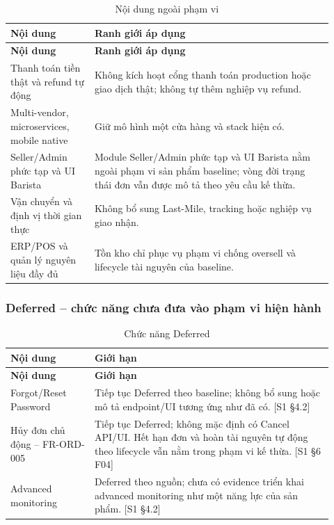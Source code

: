 \begingroup\small
\renewcommand{\arraystretch}{1.2}
\begin{longtable}{>{\raggedright\arraybackslash}p{0.24\linewidth}>{\raggedright\arraybackslash}p{0.68\linewidth}}
\caption{Nội dung ngoài phạm vi}\label{tab:auto-context-and-scope-5}\\
\hline
\textbf{Nội dung} & \textbf{Ranh giới áp dụng} \\ \hline
\endfirsthead
\textbf{Nội dung} & \textbf{Ranh giới áp dụng} \\ \hline
\endhead
Thanh toán tiền thật và refund tự động & Không kích hoạt cổng thanh toán production hoặc giao dịch thật; không tự thêm nghiệp vụ refund. \\ \hline
Multi-vendor, microservices, mobile native & Giữ mô hình một cửa hàng và stack hiện có. \\ \hline
Seller/Admin phức tạp và UI Barista & Module Seller/Admin phức tạp và UI Barista nằm ngoài phạm vi sản phẩm baseline; vòng đời trạng thái đơn vẫn được mô tả theo yêu cầu kế thừa. \\ \hline
Vận chuyển và định vị thời gian thực & Không bổ sung Last-Mile, tracking hoặc nghiệp vụ giao nhận. \\ \hline
ERP/POS và quản lý nguyên liệu đầy đủ & Tồn kho chỉ phục vụ phạm vi chống oversell và lifecycle tài nguyên của baseline. \\ \hline
\end{longtable}
\endgroup

\subsubsection{Deferred -- chức năng chưa đưa vào phạm vi hiện hành}

\begingroup\small
\renewcommand{\arraystretch}{1.2}
\begin{longtable}{>{\raggedright\arraybackslash}p{0.24\linewidth}>{\raggedright\arraybackslash}p{0.68\linewidth}}
\caption{Chức năng Deferred}\label{tab:auto-context-and-scope-6}\\
\hline
\textbf{Nội dung} & \textbf{Giới hạn} \\ \hline
\endfirsthead
\textbf{Nội dung} & \textbf{Giới hạn} \\ \hline
\endhead
Forgot/Reset Password & Tiếp tục Deferred theo baseline; không bổ sung hoặc mô tả endpoint/UI tương ứng như đã có. [S1 §4.2] \\ \hline
Hủy đơn chủ động -- FR-ORD-005 & Tiếp tục Deferred; không mặc định có Cancel API/UI. Hết hạn đơn và hoàn tài nguyên tự động theo lifecycle vẫn nằm trong phạm vi kế thừa. [S1 §6 F04] \\ \hline
Advanced monitoring & Deferred theo nguồn; chưa có evidence triển khai advanced monitoring như một năng lực của sản phẩm. [S1 §4.2] \\ \hline
\end{longtable}
\endgroup

